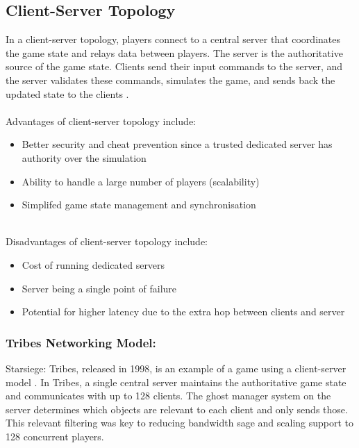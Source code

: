 \subsection{Client-Server Topology}
In a client-server topology, players connect to a central server that coordinates the game state and relays data between players. The server is the authoritative source of the game state. Clients send their input commands to the server, and the server validates these commands, simulates the game, and sends back the updated state to the clients \cite{network-architecting}.
\\
\noindent
\\
Advantages of client-server topology include:
\begin{itemize}
    \item Better security and cheat prevention since a trusted dedicated server has authority over the simulation
    \item Ability to handle a large number of players (scalability)
    \item Simplifed game state management and synchronisation
\end{itemize}
\noindent
\\
Disadvantages of client-server topology include: 
\begin{itemize}
    \item Cost of running dedicated servers
    \item Server being a single point of failure
    \item Potential for higher latency due to the extra hop between clients and server
\end{itemize}
\noindent
\subsubsection{Tribes Networking Model:}
Starsiege: Tribes, released in 1998, is an example of a game using a client-server model \cite{frohnmayer2000tribes}. In Tribes, a single central server maintains the authoritative game state and communicates with up to 128 clients. The ghost manager system on the server determines which objects are relevant to each client and only sends those. This relevant filtering was key to reducing bandwidth sage and scaling support to 128 concurrent players.

